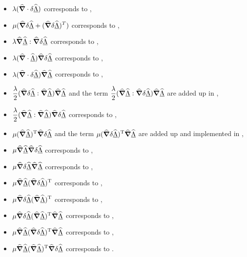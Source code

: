 \begin{itemize}
  \item $\displaystyle \lambda(\delOp\cdot\delta\Spost)$ corresponds to ,
  \item $\displaystyle \mu(\delOp\delta\Spost + (\delOp\delta\Spost)^T)$ corresponds to ,
  \item $\displaystyle \lambda\delOp\Spost:\delOp\delta\Spost$ corresponds to ,  
  \item $\displaystyle \lambda(\delOp\cdot\Spost)\delOp\delta\Spost$ corresponds to ,
  \item $\displaystyle \lambda(\delOp\cdot\delta\Spost)\delOp\Spost$ corresponds to ,
  \item $\displaystyle \frac{\lambda}{2}(\delOp\delta\Spost:\delOp\Spost)\delOp\Spost$ and the term $\displaystyle \frac{\lambda}{2}(\delOp\Spost:\delOp\delta\Spost)\delOp\Spost$ are added up in ,
  \item $\displaystyle \frac{\lambda}{2}(\delOp\Spost:\delOp\Spost)\delOp\delta\Spost$ corresponds to ,
  \item $\displaystyle \mu(\delOp\Spost)^{\text{T}}\delOp\delta\Spost$ and the term  $\displaystyle \mu(\delOp\delta\Spost)^{\text{T}}\delOp\Spost$ are added up and implemented in ,
  \item $\displaystyle \mu\delOp\Spost\delOp\delta\Spost$ corresponds to ,
  \item $\displaystyle \mu\delOp\delta\Spost\delOp\Spost$ corresponds to ,
  \item $\displaystyle \mu\delOp\Spost(\delOp\delta\Spost)^{\text{T}}$ corresponds to ,
  \item $\displaystyle \mu\delOp\delta\Spost(\delOp\Spost)^{\text{T}}$ corresponds to ,
  \item $\displaystyle \mu\delOp\delta\Spost(\delOp\Spost)^{\text{T}}\delOp\Spost$ corresponds to ,
  \item $\displaystyle \mu\delOp\Spost(\delOp\delta\Spost)^{\text{T}}\delOp\Spost$ corresponds to ,
  \item $\displaystyle \mu\delOp\Spost(\delOp\Spost)^{\text{T}}\delOp\delta\Spost$ corresponds to .
\end{itemize}


